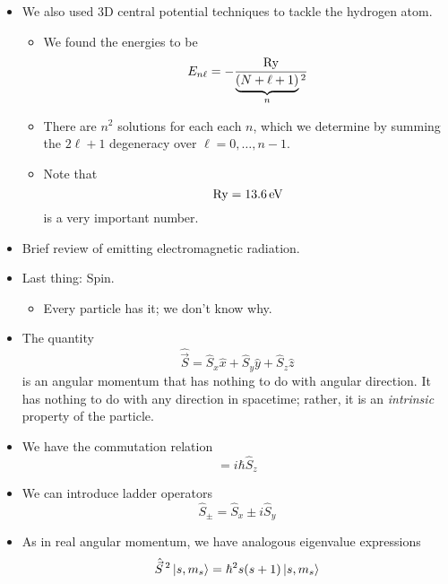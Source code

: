 \documentclass[../notes.tex]{subfiles}
\begin{document}
\begin{itemize}
\begin{itemize}
    \end{itemize}
    \item We also used 3D central potential techniques to tackle the hydrogen atom.
    \begin{itemize}
        \item We found the energies to be
        \begin{equation*}
            E_{n\ell} = -\frac{\operatorname{Ry}}{\underbrace{(N+\ell+1)}_n{}^2}
        \end{equation*}
        \item There are $n^2$ solutions for each each $n$, which we determine by summing the $2\ell+1$ degeneracy over $\ell=0,\dots,n-1$.
        \item Note that
        \begin{equation*}
            \operatorname{Ry} = \SI{13.6}{\electronvolt}
        \end{equation*}
        is a very important number.
    \end{itemize}
    \item Brief review of emitting electromagnetic radiation.
    \item Last thing: Spin.
    \begin{itemize}
        \item Every particle has it; we don't know why.
    \end{itemize}
    \item The quantity
    \begin{equation*}
        \hat{\vec{S}} = \hat{S}_x\hat{x}+\hat{S}_y\hat{y}+\hat{S}_z\hat{z}
    \end{equation*}
    is an angular momentum that has nothing to do with angular direction. It has nothing to do with any direction in spacetime; rather, it is an \emph{intrinsic} property of the particle.
    \item We have the commutation relation
    \begin{equation*}
        [\hat{S}_x,\hat{S}_y] = i\hbar\hat{S}_z
    \end{equation*}
    \item We can introduce ladder operators
    \begin{equation*}
        \hat{S}_\pm = \hat{S}_x\pm i\hat{S}_y
    \end{equation*}
    \item As in real angular momentum, we have analogous eigenvalue expressions
    \begin{align*}
        \hat{\vec{S}}{\,}^2\ket{s,m_s} &= \hbar^2s(s+1)\ket{s,m_s}\\

\end{align*}
\end{itemize}
\end{document}
